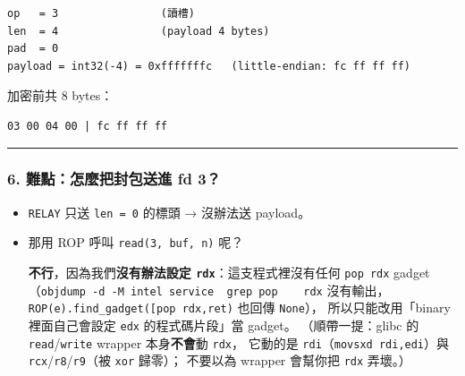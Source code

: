 \documentclass[10pt,a4paper]{article}
\begin{document}
\begin{Verbatim}[breaklines=true,breakanywhere=true,breakautoindent=false,fontsize=\fontsize{7.0}{9.5}\selectfont]
op   = 3                (讀槽)
len  = 4                (payload 4 bytes)
pad  = 0
payload = int32(-4) = 0xfffffffc   (little-endian: fc ff ff ff)
\end{Verbatim}

加密前共 8 bytes：

\begin{Verbatim}[breaklines=true,breakanywhere=true,breakautoindent=false,fontsize=\fontsize{7.0}{9.5}\selectfont]
03 00 04 00 | fc ff ff ff
\end{Verbatim}

\begin{center}\rule{0.5\linewidth}{0.5pt}\end{center}

\subsubsection{6. 難點：怎麼把封包送進 fd
3？}\label{ux96e3ux9edeux600eux9ebcux628aux5c01ux5305ux9001ux9032-fd-3}

\begin{itemize}
\item
  \texttt{RELAY} 只送 \texttt{len\ \allowbreak{}=\ \allowbreak{}0} 的標頭 → 沒辦法送 payload。
\item
  那用 ROP 呼叫 \texttt{read(3,\allowbreak{}\ \allowbreak{}buf,\allowbreak{}\ \allowbreak{}n)} 呢？

  \textbf{不行}，因為我們\textbf{沒有辦法設定
  \texttt{rdx}}：這支程式裡沒有任何 \texttt{pop\ \allowbreak{}rdx} gadget
  （\texttt{objdump\ \allowbreak{}-\allowbreak{}d\ \allowbreak{}-\allowbreak{}M\ \allowbreak{}intel\ \allowbreak{}service\ \allowbreak{}\textbar{}\allowbreak{}\ \allowbreak{}grep\ \allowbreak{}\textquotesingle{}\allowbreak{}pop\ \allowbreak{}\ \allowbreak{}\ \allowbreak{}\ \allowbreak{}rdx\textquotesingle{}\allowbreak{}}
  沒有輸出，
  \texttt{ROP(e).\allowbreak{}find\_\allowbreak{}gadget({[}\textquotesingle{}\allowbreak{}pop\ \allowbreak{}rdx\textquotesingle{}\allowbreak{},\allowbreak{}\textquotesingle{}\allowbreak{}ret\textquotesingle{}\allowbreak{}{]})}
  也回傳 \texttt{None}）， 所以只能改用「binary 裡面自己會設定
  \texttt{edx} 的程式碼片段」當 gadget。 （順帶一提：glibc 的
  \texttt{read}/\texttt{write} wrapper 本身\textbf{不會}動
  \texttt{rdx}， 它動的是 \texttt{rdi}（\texttt{movsxd\ \allowbreak{}rdi,\allowbreak{}edi}）與
  \texttt{rcx}/\texttt{r8}/\texttt{r9}（被 \texttt{xor} 歸零）；
  不要以為 wrapper 會幫你把 \texttt{rdx} 弄壞。）
\end{itemize}
\end{document}
